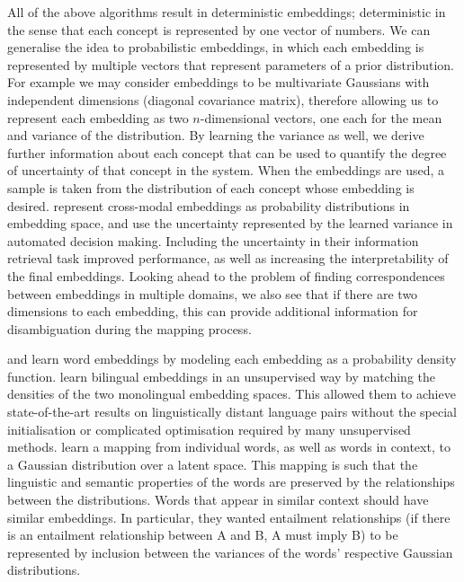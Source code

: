 All of the above algorithms result in deterministic embeddings; deterministic in the sense that each concept is represented by one vector of numbers. We can generalise the idea to probabilistic embeddings, in which each embedding is represented by multiple vectors that represent parameters of a prior distribution. For example we may consider embeddings to be multivariate Gaussians with independent dimensions (diagonal covariance matrix), therefore allowing us to represent each embedding as two $n$-dimensional vectors, one each for the mean and variance of the distribution. By learning the variance as well, we derive further information about each concept that can be used to quantify the degree of uncertainty of that concept in the system. When the embeddings are used, a sample is taken from the distribution of each concept whose embedding is desired. \cite{ProbabilisticEmbeddingsCrossModal} represent cross-modal embeddings as probability distributions in embedding space, and use the uncertainty represented by the learned variance in automated decision making. Including the uncertainty in their information retrieval task improved performance, as well as increasing the interpretability of the final embeddings. Looking ahead to the problem of finding correspondences between embeddings in multiple domains, we also see that if there are two dimensions to each embedding, this can provide additional information for disambiguation during the mapping process. 

\cite{DensityMatchingWordEmbeddings} and \cite{vilnis2015word} learn word embeddings by modeling each embedding as a probability density function. \cite{DensityMatchingWordEmbeddings} learn bilingual embeddings in an unsupervised way by matching the densities of the two monolingual embedding spaces. This allowed them to achieve state-of-the-art results on linguistically distant language pairs without the special initialisation or complicated optimisation required by many unsupervised methods. \cite{vilnis2015word} learn a mapping from individual words, as well as words in context, to a Gaussian distribution over a latent space. This mapping is such that the linguistic and semantic properties of the words are preserved by the relationships between the distributions. Words that appear in similar context should have similar embeddings. In particular, they wanted entailment relationships (if there is an entailment relationship between A and B, A must imply B) to be represented by inclusion between the variances of the words' respective Gaussian distributions. 

